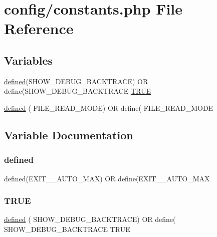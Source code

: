 \hypertarget{constants_8php}{}\section{config/constants.php File Reference}
\label{constants_8php}
\subsection*{Variables}
\begin{DoxyCompactItemize}
\item 
\mbox{\hyperlink{password_8php_a74f41c0efe4435fb8ac2133464d3cd57}{defined}}(\textquotesingle{}S\+H\+O\+W\+\_\+\+D\+E\+B\+U\+G\+\_\+\+B\+A\+C\+K\+T\+R\+A\+CE\textquotesingle{}) OR define(\textquotesingle{}S\+H\+O\+W\+\_\+\+D\+E\+B\+U\+G\+\_\+\+B\+A\+C\+K\+T\+R\+A\+CE\textquotesingle{} \mbox{\hyperlink{constants_8php_ae04a3efe6aa42044f803ee90c2277846}{T\+R\+UE}}
\item 
\mbox{\hyperlink{constants_8php_acf67d074d9db42fcec0e958fd8223165}{defined}} ( \textquotesingle{}F\+I\+L\+E\+\_\+\+R\+E\+A\+D\+\_\+\+M\+O\+DE\textquotesingle{}) OR define( \textquotesingle{}F\+I\+L\+E\+\_\+\+R\+E\+A\+D\+\_\+\+M\+O\+DE\textquotesingle{}
\end{DoxyCompactItemize}


\subsection{Variable Documentation}
\mbox{\label{constants_8php_acf67d074d9db42fcec0e958fd8223165}} 
\subsubsection{\texorpdfstring{defined}{defined}}
{\footnotesize\ttfamily defined(\textquotesingle{}E\+X\+I\+T\+\_\+\+\_\+\+A\+U\+T\+O\+\_\+\+M\+AX\textquotesingle{}) OR define(\textquotesingle{}E\+X\+I\+T\+\_\+\+\_\+\+A\+U\+T\+O\+\_\+\+M\+AX\textquotesingle{}}

\mbox{\label{constants_8php_ae04a3efe6aa42044f803ee90c2277846}} 
\subsubsection{\texorpdfstring{T\+R\+UE}{TRUE}}
{\footnotesize\ttfamily \mbox{\hyperlink{password_8php_a74f41c0efe4435fb8ac2133464d3cd57}{defined}} ( \textquotesingle{}S\+H\+O\+W\+\_\+\+D\+E\+B\+U\+G\+\_\+\+B\+A\+C\+K\+T\+R\+A\+CE\textquotesingle{}) OR define( \textquotesingle{}S\+H\+O\+W\+\_\+\+D\+E\+B\+U\+G\+\_\+\+B\+A\+C\+K\+T\+R\+A\+CE\textquotesingle{} T\+R\+UE}

